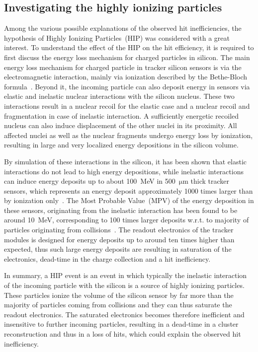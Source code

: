 
\subsection{Investigating the highly ionizing particles}

Among the various possible explanations of the observed hit inefficiencies, the hypothesis of Highly Ionizing Particles~(HIP) was considered with a great interest. To understand the effect of the HIP on the hit efficiency, it is required to first discuss the energy loss mechanism for charged particles in silicon. The main energy loss mechanism for charged particle in tracker silicon sensors is via the electromagnetic interaction, mainly via ionization described by the Bethe-Bloch formula~\cite{Groom:2000sm}. Beyond it, the incoming particle can also deposit energy in sensors via elastic and inelastic nuclear interactions with the silicon nucleus. These two interactions result in a nuclear recoil for the elastic case and a nuclear recoil and fragmentation in case of inelastic interaction. A sufficiently energetic recoiled nucleus can also induce displacement of the other nuclei in its proximity. All affected nuclei as well as the nuclear fragments undergo energy loss by ionization, resulting in large and very localized energy depositions in the silicon volume. 

By simulation of these interactions in the silicon, it has been shown that elastic interactions do not lead to high energy depositions, while inelastic interactions can induce energy deposits up to about 100~MeV in 500~$\mathrm{\mu m}$ thick tracker sensors, which represents an energy deposit approximately 1000 times larger than by ionization only~\cite{Huhtinen:2002yda}. The Most Probable Value~(MPV) of the energy deposition in these sensors, originating from the inelastic interaction has been found to be around 10~MeV, corresponding to 100 times larger deposits w.r.t. to majority of particles originating from collisions~\cite{Adam:2005pz}. The readout electronics of the tracker modules is designed for energy deposits up to around ten times higher than expected, thus such large energy deposits are resulting in saturation of the electronics, dead-time in the charge collection and a hit inefficiency. 

In summary, a HIP event is an event in which typically the inelastic interaction of the incoming particle with the silicon is a source of highly ionizing particles. These particles ionize the volume of the silicon sensor by far more than the majority of particles coming from collisions and they can thus saturate the readout electronics. The saturated electronics becomes therefore inefficient and insensitive to further incoming particles, resulting in a dead-time in a cluster reconstruction and thus in a loss of hits, which could explain the observed hit inefficiency.


